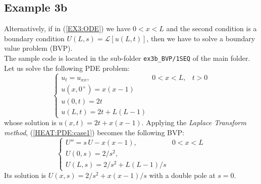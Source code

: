 \documentclass[a4paper,10pt]{report}%
\begin{document}
\subsection{Example 3b}\label{EX3b}
Alternatively, if in (\ref{EX3:ODE}) we have $0<x<L$ and the second condition is a boundary condition $U(L,s)={\mathscr L}[u(L,t)]$, then we have to solve a boundary value problem (BVP).
\\
The sample code is located in the sub-folder {\tt ex3b\_BVP/1SEQ} of the main folder.
\\
Let us solve the following PDE problem:
\begin{equation}\label{HEAT:PDE:case1}
\left\{\begin{array}{lll}
u_t = u_{xx},       & 0<x<L, & t>0 \\
u(x,0^+) = x(x-1) \\
u(0,t) = 2t       \\
u(L,t) = 2t+L(L-1)
\end{array}\right.
\end{equation}
whose solution is $u(x,t) = 2t+x(x-1)$.
Applying the {\em Laplace Transform method}, (\ref{HEAT:PDE:case1}) becomes the following BVP:
\begin{equation}\label{HEAT:ODE:case1}
\left\{\begin{array}{ll}
U'' = s\,U - x(x-1),    & 0<x<L \\
U(0,s) = 2/s^2, \\
U(L,s) = 2/s^2 + L(L-1)/s
\end{array}\right.
\end{equation}
Its solution is $U(x,s) = 2/s^2 + x(x-1)/s$ with a double pole at $s=0$.
\end{document}

